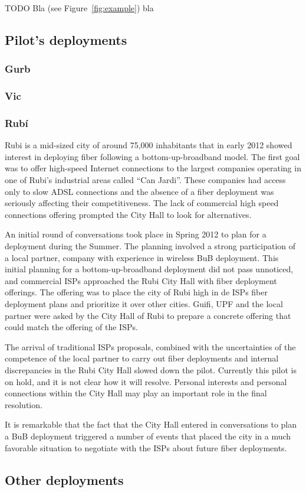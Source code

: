 TODO Bla (see Figure~\ref{fig:example}) bla


\subsection{Pilot's deployments}

\subsubsection{Gurb}

\subsubsection{Vic}

\subsubsection{Rub\'{i}}

Rubi is a mid-sized city of around 75,000 inhabitants that in early 2012 showed interest in deploying fiber following a bottom-up-broadband model.
The first goal was to offer high-speed Internet connections to the largest companies operating in one of Rubi's industrial areas called ``Can Jardi''.
These companies had access only to slow ADSL connections and the absence of a fiber deployment was seriously affecting their competitiveness.
The lack of commercial high speed connections offering prompted the City Hall to look for alternatives.

An initial round of conversations took place in Spring 2012 to plan for a deployment during the Summer.
The planning involved a strong participation of a local partner, company with experience in wireless BuB deployment.
This initial planning for a bottom-up-broadband deployment did not pass unnoticed, and commercial ISPs approached the Rubi City Hall with fiber deployment offerings.
The offering was to place the city of Rubi high in de ISPs fiber deployment plans and prioritize it over other cities.
Guifi, UPF and the local partner were asked by the City Hall of Rubi to prepare a concrete offering that could match the offering of the ISPs.

The arrival of traditional ISPs proposals, combined with the uncertainties of the competence of the local partner to carry out fiber deployments and internal discrepancies in the Rubi City Hall slowed down the pilot.
Currently this pilot is on hold, and it is not clear how it will resolve.
Personal interests and personal connections within the City Hall may play an important role in the final resolution.

It is remarkable that the fact that the City Hall entered in conversations to plan a BuB deployment triggered a number of events that placed the city in a much favorable situation to negotiate with the ISPs about future fiber deployments.


\subsection{Other deployments}

